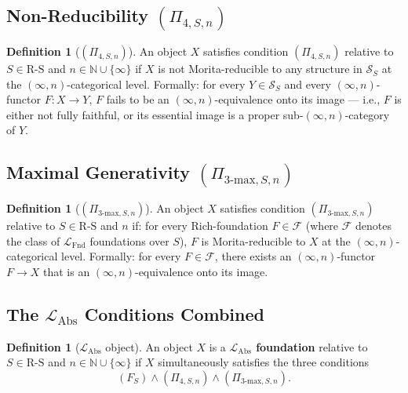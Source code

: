 \documentclass[11pt]{article}
\theoremstyle{plain}
\theoremstyle{definition}
\newtheorem{definition}[theorem]{Definition}
\newcommand{\RS}{\mathrm{R\text{-}S}}
\newcommand{\cS}{\mathcal{S}}
\newcommand{\cF}{\mathcal{F}}
\newcommand{\LFnd}{\mathcal{L}_{\mathrm{Fnd}}}
\newcommand{\LAbs}{\mathcal{L}_{\mathrm{Abs}}}
\begin{document}
\subsection{\texorpdfstring{Non-Reducibility $(\Pi_{4, S, n})$}{Non-Reducibility (Pi\_4,S,n)}}

\begin{definition}[$(\Pi_{4, S, n})$]\label{def:pi4}
An object $X$ satisfies condition $(\Pi_{4, S, n})$ relative to $S \in \RS$ and $n \in \mathbb{N} \cup \{\infty\}$ if $X$ is not Morita-reducible to any structure in $\cS_S$ at the $(\infty, n)$-categorical level. Formally: for every $Y \in \cS_S$ and every $(\infty, n)$-functor $F : X \to Y$, $F$ fails to be an $(\infty, n)$-equivalence onto its image --- i.e., $F$ is either not fully faithful, or its essential image is a proper sub-$(\infty, n)$-category of $Y$.
\end{definition}


\subsection{\texorpdfstring{Maximal Generativity $(\Pi_{3\text{-max}, S, n})$}{Maximal Generativity (Pi\_3-max,S,n)}}

\begin{definition}[$(\Pi_{3\text{-max}, S, n})$]\label{def:pi3max}
An object $X$ satisfies condition $(\Pi_{3\text{-max}, S, n})$ relative to $S \in \RS$ and $n$ if: for every Rich-foundation $F \in \cF$ (where $\cF$ denotes the class of $\LFnd$ foundations over $S$), $F$ is Morita-reducible to $X$ at the $(\infty, n)$-categorical level. Formally: for every $F \in \cF$, there exists an $(\infty, n)$-functor $F \to X$ that is an $(\infty, n)$-equivalence onto its image.
\end{definition}


\subsection{\texorpdfstring{The $\LAbs$ Conditions Combined}{The L\_Abs Conditions Combined}}

\begin{definition}[$\LAbs$ object]\label{def:level6}
An object $X$ is a \textbf{$\LAbs$ foundation} relative to $S \in \RS$ and $n \in \mathbb{N} \cup \{\infty\}$ if $X$ simultaneously satisfies the three conditions
\[ (F_S) \wedge (\Pi_{4, S, n}) \wedge (\Pi_{3\text{-max}, S, n}). \]
\end{definition}
\end{document}
